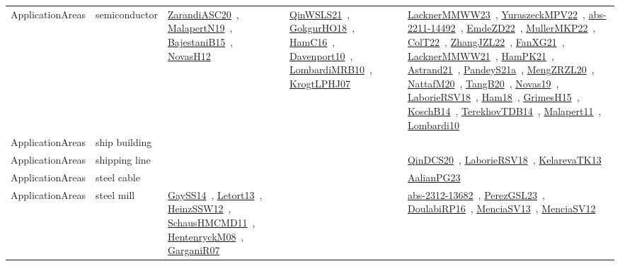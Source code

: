 {\begin{longtable}{lp{3cm}>{\raggedright\arraybackslash}p{6cm}>{\raggedright\arraybackslash}p{6cm}>{\raggedright\arraybackslash}p{8cm}}
ApplicationAreas & semiconductor & \href{works/ZarandiASC20.pdf}{ZarandiASC20}~\cite{ZarandiASC20}, \href{works/MalapertN19.pdf}{MalapertN19}~\cite{MalapertN19}, \href{works/BajestaniB15.pdf}{BajestaniB15}~\cite{BajestaniB15}, \href{works/NovasH12.pdf}{NovasH12}~\cite{NovasH12} & \href{works/QinWSLS21.pdf}{QinWSLS21}~\cite{QinWSLS21}, \href{works/GokgurHO18.pdf}{GokgurHO18}~\cite{GokgurHO18}, \href{works/HamC16.pdf}{HamC16}~\cite{HamC16}, \href{works/Davenport10.pdf}{Davenport10}~\cite{Davenport10}, \href{works/LombardiMRB10.pdf}{LombardiMRB10}~\cite{LombardiMRB10}, \href{works/KrogtLPHJ07.pdf}{KrogtLPHJ07}~\cite{KrogtLPHJ07} & \href{works/LacknerMMWW23.pdf}{LacknerMMWW23}~\cite{LacknerMMWW23}, \href{works/YuraszeckMPV22.pdf}{YuraszeckMPV22}~\cite{YuraszeckMPV22}, \href{works/abs-2211-14492.pdf}{abs-2211-14492}~\cite{abs-2211-14492}, \href{works/EmdeZD22.pdf}{EmdeZD22}~\cite{EmdeZD22}, \href{works/MullerMKP22.pdf}{MullerMKP22}~\cite{MullerMKP22}, \href{works/ColT22.pdf}{ColT22}~\cite{ColT22}, \href{works/ZhangJZL22.pdf}{ZhangJZL22}~\cite{ZhangJZL22}, \href{works/FanXG21.pdf}{FanXG21}~\cite{FanXG21}, \href{works/LacknerMMWW21.pdf}{LacknerMMWW21}~\cite{LacknerMMWW21}, \href{works/HamPK21.pdf}{HamPK21}~\cite{HamPK21}, \href{works/Astrand21.pdf}{Astrand21}~\cite{Astrand21}, \href{works/PandeyS21a.pdf}{PandeyS21a}~\cite{PandeyS21a}, \href{works/MengZRZL20.pdf}{MengZRZL20}~\cite{MengZRZL20}, \href{works/NattafM20.pdf}{NattafM20}~\cite{NattafM20}, \href{works/TangB20.pdf}{TangB20}~\cite{TangB20}, \href{works/Novas19.pdf}{Novas19}~\cite{Novas19}, \href{works/LaborieRSV18.pdf}{LaborieRSV18}~\cite{LaborieRSV18}, \href{works/Ham18.pdf}{Ham18}~\cite{Ham18}, \href{works/GrimesH15.pdf}{GrimesH15}~\cite{GrimesH15}, \href{works/KoschB14.pdf}{KoschB14}~\cite{KoschB14}, \href{works/TerekhovTDB14.pdf}{TerekhovTDB14}~\cite{TerekhovTDB14}, \href{works/Malapert11.pdf}{Malapert11}~\cite{Malapert11}, \href{works/Lombardi10.pdf}{Lombardi10}~\cite{Lombardi10}\\
ApplicationAreas & ship building &  &  & \\
ApplicationAreas & shipping line &  &  & \href{works/QinDCS20.pdf}{QinDCS20}~\cite{QinDCS20}, \href{works/LaborieRSV18.pdf}{LaborieRSV18}~\cite{LaborieRSV18}, \href{works/KelarevaTK13.pdf}{KelarevaTK13}~\cite{KelarevaTK13}\\
ApplicationAreas & steel cable &  &  & \href{works/AalianPG23.pdf}{AalianPG23}~\cite{AalianPG23}\\
ApplicationAreas & steel mill & \href{works/GaySS14.pdf}{GaySS14}~\cite{GaySS14}, \href{works/Letort13.pdf}{Letort13}~\cite{Letort13}, \href{works/HeinzSSW12.pdf}{HeinzSSW12}~\cite{HeinzSSW12}, \href{works/SchausHMCMD11.pdf}{SchausHMCMD11}~\cite{SchausHMCMD11}, \href{works/HentenryckM08.pdf}{HentenryckM08}~\cite{HentenryckM08}, \href{works/GarganiR07.pdf}{GarganiR07}~\cite{GarganiR07} &  & \href{works/abs-2312-13682.pdf}{abs-2312-13682}~\cite{abs-2312-13682}, \href{works/PerezGSL23.pdf}{PerezGSL23}~\cite{PerezGSL23}, \href{works/DoulabiRP16.pdf}{DoulabiRP16}~\cite{DoulabiRP16}, \href{works/MenciaSV13.pdf}{MenciaSV13}~\cite{MenciaSV13}, \href{works/MenciaSV12.pdf}{MenciaSV12}~\cite{MenciaSV12}\\

\end{longtable}}
